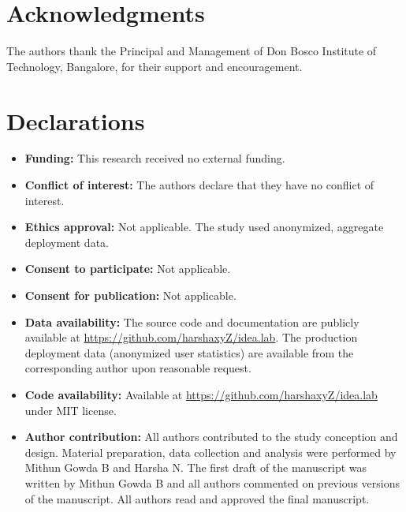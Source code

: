 \documentclass[11pt,a4paper]{article}
\theoremstyle{plain}
\theoremstyle{definition}
\begin{document}

\section*{Acknowledgments}

The authors thank the Principal and Management of Don Bosco Institute of Technology, Bangalore, for their support and encouragement.

\section*{Declarations}

\begin{itemize}[noitemsep,topsep=3pt]
    \item \textbf{Funding:} This research received no external funding.
    \item \textbf{Conflict of interest:} The authors declare that they have no conflict of interest.
    \item \textbf{Ethics approval:} Not applicable. The study used anonymized, aggregate deployment data.
    \item \textbf{Consent to participate:} Not applicable.
    \item \textbf{Consent for publication:} Not applicable.
    \item \textbf{Data availability:} The source code and documentation are publicly available at \url{https://github.com/harshaxyZ/idea.lab}. The production deployment data (anonymized user statistics) are available from the corresponding author upon reasonable request.
    \item \textbf{Code availability:} Available at \url{https://github.com/harshaxyZ/idea.lab} under MIT license.
    \item \textbf{Author contribution:} All authors contributed to the study conception and design. Material preparation, data collection and analysis were performed by Mithun Gowda B and Harsha N. The first draft of the manuscript was written by Mithun Gowda B and all authors commented on previous versions of the manuscript. All authors read and approved the final manuscript.
\end{itemize}



\end{document}
